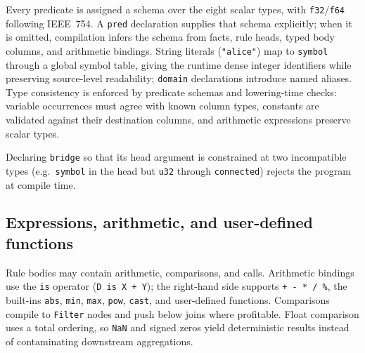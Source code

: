 Every predicate is assigned a schema over the eight scalar types, with \texttt{f32}/\texttt{f64} following IEEE~754. A \texttt{pred} declaration supplies that schema explicitly; when it is omitted, compilation infers the schema from facts, rule heads, typed body columns, and arithmetic bindings. String literals (\texttt{"alice"}) map to \texttt{symbol} through a global symbol table, giving the runtime dense integer identifiers while preserving source-level readability; \texttt{domain} declarations introduce named aliases. Type consistency is enforced by predicate schemas and lowering-time checks: variable occurrences must agree with known column types, constants are validated against their destination columns, and arithmetic expressions preserve scalar types.



Declaring \texttt{bridge} so that its head argument is constrained at two incompatible types (e.g.\ \texttt{symbol} in the head but \texttt{u32} through \texttt{connected}) rejects the program at compile time.

\subsection{Expressions, arithmetic, and user-defined functions}\label{sec:lang:arith}

Rule bodies may contain arithmetic, comparisons, and calls. Arithmetic bindings use the \texttt{is} operator (\texttt{D is X + Y}); the right-hand side supports \texttt{+ - * / \%}, the built-ins \texttt{abs}, \texttt{min}, \texttt{max}, \texttt{pow}, \texttt{cast}, and user-defined functions. Comparisons compile to \texttt{Filter} nodes and push below joins where profitable. Float comparison uses a total ordering, so \texttt{NaN} and signed zeros yield deterministic results instead of contaminating downstream aggregations.



